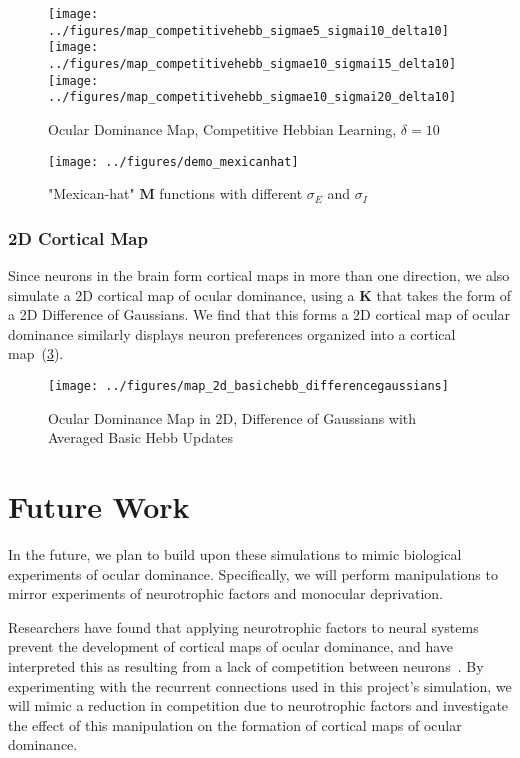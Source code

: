 \documentclass[pageno]{mat323paper}
\begin{document}
\begin{figure}[h]
\texttt{[image: ../figures/map\_competitivehebb\_sigmae5\_sigmai10\_delta10]}
\texttt{[image: ../figures/map\_competitivehebb\_sigmae10\_sigmai15\_delta10]}
\texttt{[image: ../figures/map\_competitivehebb\_sigmae10\_sigmai20\_delta10]}
\caption{Ocular Dominance Map, Competitive Hebbian Learning, $\delta=10$}
\label{fig:map_competitivehebb_delta10}
\end{figure}

\begin{figure}[h]
\centering
\texttt{[image: ../figures/demo\_mexicanhat]}
\caption{"Mexican-hat" $\mathbf{M}$ functions with different $\sigma_E$ and $\sigma_I$}
\label{fig:demo_mexicanhat}
\end{figure}

\subsubsection{2D Cortical Map}
Since neurons in the brain form cortical maps in more than one direction, we also simulate a 2D cortical map of ocular dominance, using a $\mathbf{K}$ that takes the form of a 2D Difference of Gaussians. We find that this forms a 2D cortical map of ocular dominance similarly displays neuron preferences organized into a cortical map~(\ref{fig:map_2d}).

\begin{figure}
\centering
\texttt{[image: ../figures/map\_2d\_basichebb\_differencegaussians]}
\caption{Ocular Dominance Map in 2D, Difference of Gaussians with Averaged Basic Hebb Updates}
\label{fig:map_2d}
\end{figure}

\section{Future Work}
In the future, we plan to build upon these simulations to mimic biological experiments of ocular dominance. Specifically, we will perform manipulations to mirror experiments of neurotrophic factors and monocular deprivation.

Researchers have found that applying neurotrophic factors to neural systems prevent the development of cortical maps of ocular dominance, and have interpreted this as resulting from a lack of competition between neurons~\cite{harris_model_1997}. By experimenting with the recurrent connections used in this project's simulation, we will mimic a reduction in competition due to neurotrophic factors and investigate the effect of this manipulation on the formation of cortical maps of ocular dominance.
\end{document}
